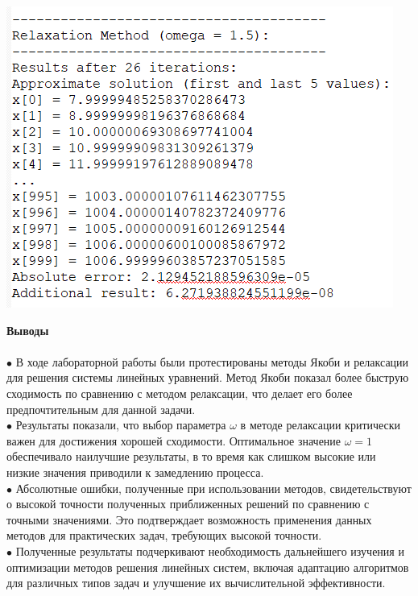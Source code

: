 \documentclass[a4paper, 12pt]{report}
\begin{document}
   \begin{center}
        \includegraphics[scale = 0.7]{pic12.png}
   \end{center}
   

    \newpage
   \textbf{\Huge{Выводы}}\\\\
      $\bullet$  В ходе лабораторной работы были протестированы методы Якоби и релаксации для решения системы линейных уравнений. Метод Якоби показал более быструю сходимость по сравнению с методом релаксации, что делает его более предпочтительным для данной задачи.\\
      $\bullet$  Результаты показали, что выбор параметра $\omega$ в методе релаксации критически важен для достижения хорошей сходимости. Оптимальное значение $\omega = 1$ обеспечивало наилучшие результаты, в то время как слишком высокие или низкие значения приводили к замедлению процесса.\\
      $\bullet$ Абсолютные ошибки, полученные при использовании методов, свидетельствуют о высокой точности полученных приближенных решений по сравнению с точными значениями. Это подтверждает возможность применения данных методов для практических задач, требующих высокой точности.\\
      $\bullet$ Полученные результаты подчеркивают необходимость дальнейшего изучения и оптимизации методов решения линейных систем, включая адаптацию алгоритмов для различных типов задач и улучшение их вычислительной эффективности.\\
   
\end{document}
